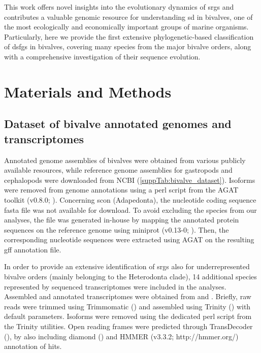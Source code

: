 This work offers novel insights into the evolutionary dynamics of \glspl{srg} and contributes a valuable genomic resource for understanding \gls{sd} in bivalves, one of the most ecologically and economically important groups of marine organisms. Particularly, here we provide the first extensive phylogenetic-based classification of \glspl{dsfg} in bivalves, covering many species from the major bivalve orders, along with a comprehensive investigation of their sequence evolution.

\section{Materials and Methods} \label{chapter3_MM}
\subsection{Dataset of bivalve annotated genomes and transcriptomes}
Annotated genome assemblies of bivalves were obtained from various publicly available resources, while reference genome assemblies for gastropods and cephalopods were downloaded from NCBI (\cref{suppTab:bivalve_dataset}). Isoforms were removed from genome annotations using a perl script from the AGAT toolkit (v0.8.0; ). Concerning \gls{scon} (Adapedonta), the nucleotide coding sequence fasta file was not available for download. To avoid excluding the species from our analyses, the file was generated in-house by mapping the annotated protein sequences on the reference genome using miniprot (v0.13-0; ). Then, the corresponding nucleotide sequences were extracted using AGAT on the resulting gff annotation file.

In order to provide an extensive identification of \glspl{srg} also for underrepresented bivalve orders (mainly belonging to the Heterodonta clade), 14 additional species represented by sequenced transcriptomes were included in the analyses. Assembled and annotated transcriptomes were obtained from  and . Briefly, raw reads were trimmed using Trimmomatic () and assembled using Trinity () with default parameters. Isoforms were removed using the dedicated perl script from the Trinity utilities. Open reading frames were predicted through TransDecoder (), by also including diamond () and HMMER (v3.3.2; http://hmmer.org/) annotation of hits.

